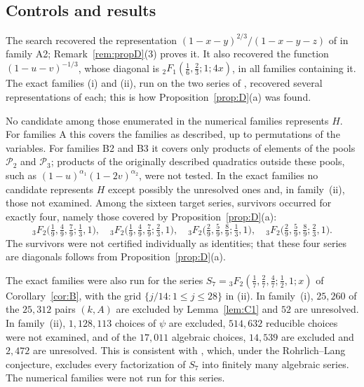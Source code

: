 \documentclass[11pt]{amsart}
\theoremstyle{definition}
\theoremstyle{remark}
\numberwithin{equation}{section}
\begin{document}
\subsection*{Controls and results}
The search recovered the representation $(1-x-y)^{2/3}/(1-x-y-z)$ of \citet{AbdelazizKoutschanMaillard2020} in family A2; Remark~\ref{rem:propD}(3) proves it. It also recovered the function $(1-u-v)^{-1/3}$, whose diagonal is ${}_2F_1(\frac16,\frac23;1;4x)$, in all families containing it. The exact families (i) and (ii), run on the two series of \citet{AbdelazizKoutschanMaillard2020}, recovered several representations of each; this is how Proposition~\ref{prop:D}(a) was found.

No candidate among those enumerated in the numerical families represents $H$. For families A this covers the families as described, up to permutations of the variables. For families B2 and B3 it covers only products of elements of the pools $\mathcal P_2$ and $\mathcal P_3$; products of the originally described quadratics outside these pools, such as $(1-u)^{\alpha_1}(1-2v)^{\alpha_2}$, were not tested. In the exact families no candidate represents $H$ except possibly the unresolved ones and, in family~(ii), those not examined. Among the sixteen target series, survivors occurred for exactly four, namely those covered by Proposition~\ref{prop:D}(a):
\[
{}_3F_2\big(\tfrac19,\tfrac49,\tfrac79;\tfrac13,1\big),\quad{}_3F_2\big(\tfrac19,\tfrac49,\tfrac79;\tfrac23,1\big),\quad{}_3F_2\big(\tfrac29,\tfrac59,\tfrac89;\tfrac13,1\big),\quad{}_3F_2\big(\tfrac29,\tfrac59,\tfrac89;\tfrac23,1\big).
\]
The survivors were not certified individually as identities; that these four series are diagonals follows from Proposition~\ref{prop:D}(a).

The exact families were also run for the series $S_7={}_3F_2(\frac17,\frac27,\frac47;\frac12,1;x)$ of Corollary~\ref{cor:B}, with the grid $\{j/14:1\le j\le28\}$ in (ii). In family~(i), $25{,}260$ of the $25{,}312$ pairs $(k,A)$ are excluded by Lemma~\ref{lem:C1} and $52$ are unresolved. In family~(ii), $1{,}128{,}113$ choices of $\psi$ are excluded, $514{,}632$ reducible choices were not examined, and of the $17{,}011$ algebraic choices, $14{,}539$ are excluded and $2{,}472$ are unresolved. This is consistent with \citet[Proposition~1]{RivoalRoques2014}, which, under the Rohrlich--Lang conjecture, excludes every factorization of $S_7$ into finitely many algebraic series. The numerical families were not run for this series.
\end{document}
